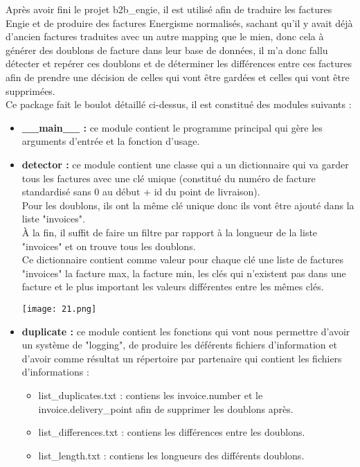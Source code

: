 Après avoir fini le projet b2b{\_}engie, il est utilisé afin de traduire les factures Engie et de produire des factures Energisme normalisés, sachant qu'il y avait déjà d’ancien factures traduites avec un autre mapping que le mien, donc cela à générer des doublons de facture dans leur base de données, il m'a donc fallu détecter et repérer ces doublons et de déterminer les différences entre ces factures afin de prendre une décision de celles qui vont être gardées et celles qui vont être supprimées.\\
Ce package fait le boulot détaillé ci-dessus, il est constitué des modules suivants :
\begin{itemize}
	\item \textbf{{\_}{\_}main{\_}{\_} :} ce module contient le programme principal qui gère les arguments d'entrée et la fonction d'usage.
	\item \textbf{detector :} ce module contient une classe qui  a un dictionnaire  qui va garder tous les factures avec une clé unique (constitué du numéro de facture standardisé sans 0 au début + id du point de livraison).\\
Pour les doublons, ils ont la même clé unique donc ils vont être ajouté dans la liste "invoices".\\
À la fin, il suffit de faire un filtre par rapport à la longueur de la liste "invoices" et on trouve tous les doublons.\\
Ce dictionnaire contient comme valeur pour chaque clé une liste de factures "invoices" la facture max, la facture min, les clés qui n'existent pas dans une facture et le plus important les valeurs différentes entre les mêmes clés.
	\begin{center}
		\texttt{[image: 21.png]}
	\end{center}	 
	\item \textbf{duplicate :} ce module contient les fonctions qui vont nous permettre d'avoir un système de "logging", de produire les déférents fichiers d'information et d'avoir comme résultat un répertoire par partenaire qui contient les fichiers d'informations :
	\begin{itemize}
		\item list{\_}duplicates.txt : contiens les invoice.number et le invoice.delivery{\_}point afin de supprimer les doublons après.
		\item list{\_}differences.txt : contiens les différences entre les doublons.
		\item list{\_}length.txt : contiens les longueurs des différents doublons.
	\end{itemize}
\end{itemize}    
